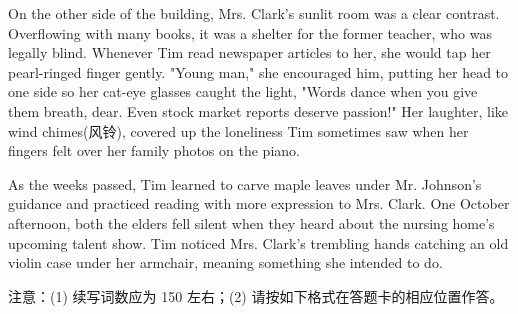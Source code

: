 \documentclass{英语试卷}
\begin{document}
\par On the other side of the building, Mrs. Clark's sunlit room was a clear contrast. Overflowing with many books, it was a shelter for the former teacher, who was legally blind. Whenever Tim read newspaper articles to her, she would tap her pearl-ringed finger gently. "Young man," she encouraged him, putting her head to one side so her cat-eye glasses caught the light, "Words dance when you give them breath, dear. Even stock market reports deserve passion!" Her laughter, like wind chimes(风铃), covered up the loneliness Tim sometimes saw when her fingers felt over her family photos on the piano.\par
\par As the weeks passed, Tim learned to carve maple leaves under Mr. Johnson's guidance and practiced reading with more expression to Mrs. Clark. One October afternoon, both the elders fell silent when they heard about the nursing home's upcoming talent show. Tim noticed Mrs. Clark's trembling hands catching an old violin case under her armchair, meaning something she intended to do.\par
\par 注意：(1) 续写词数应为 150 左右；(2) 请按如下格式在答题卡的相应位置作答。\par
{}
\end{document}
